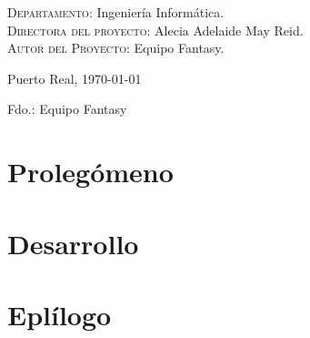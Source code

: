 \documentclass{book}
\begin{document}
{\begin{flushleft}
		\textsc{Departamento}: \nohyphens{Ingeniería Informática.} \\
		\textsc{Directora del proyecto}: \nohyphens{Alecia Adelaide May Reid.} \\
		\textsc{Autor del Proyecto}: \nohyphens{Equipo Fantasy}. \\
	\end{flushleft}
	
	\bigskip
	\bigskip
	\bigskip
	
	\begin{flushright}
		\large
		Puerto Real, \today
		
		\bigskip    
		\bigskip
		\bigskip
		\bigskip
		\bigskip
		\bigskip
		\bigskip
		\bigskip
		Fdo.: Equipo Fantasy
		
	\end{flushright}
	
}
	
	\newpage
	
	
	
	\tableofcontents
	\newpage
	
	\part{Prolegómeno}
	
	
	
	\part{Desarrollo}
	
	
	
	

	\part{Eplílogo}
	
	
	
	
\end{document}
